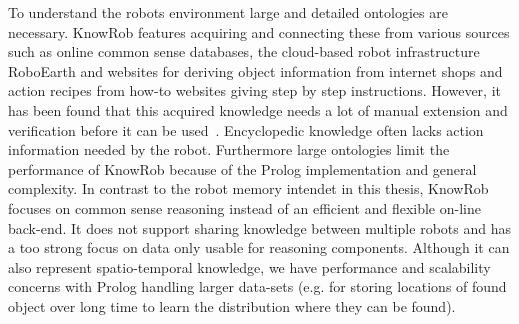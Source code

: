 \documentclass[a4paper,11pt]{article}
\begin{document}
To understand the robots environment large and detailed ontologies are
necessary. KnowRob features acquiring and connecting these from
various sources such as online common sense databases, the cloud-based
robot infrastructure RoboEarth and websites for
deriving object information from internet shops and action recipes
from how-to websites giving step by step instructions.
However, it has been found that this acquired
knowledge needs a lot of manual extension and verification before it
can be used~\cite{KnowRob-Web}. Encyclopedic knowledge often lacks
action information needed by the robot. %
%
Furthermore large ontologies limit the performance of KnowRob because
of the Prolog implementation and general complexity. In contrast to
the robot memory intendet in this thesis, KnowRob focuses on common
sense reasoning instead of an efficient and flexible on-line
back-end. It does not support sharing knowledge between multiple
robots and has a too strong focus on data only usable for reasoning
components. Although it can also represent spatio-temporal knowledge,
we have performance and scalability concerns with Prolog handling
larger data-sets (e.g. for storing locations of found object over long
time to learn the distribution where they can be found).
\end{document}
